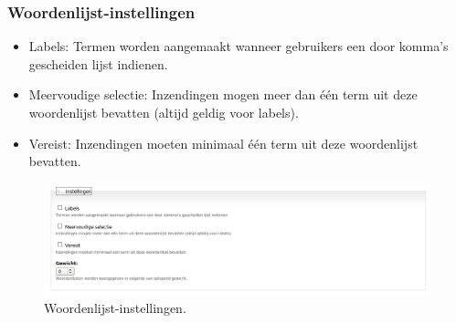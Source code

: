  \subsubsection{Woordenlijst-instellingen} 
 \begin{itemize}
\item Labels: Termen worden aangemaakt wanneer gebruikers een door komma's
gescheiden lijst indienen.
\item Meervoudige selectie: Inzendingen mogen meer dan \'e\'en term uit deze
woordenlijst bevatten (altijd geldig voor labels).
\item Vereist: Inzendingen moeten minimaal \'e\'en term uit deze woordenlijst
bevatten.
\end{itemize}
\begin{figure}[!h]
    \centering
   \includegraphics[scale=0.3,angle=0]{woordenlijst-instellingen}
   \caption{Woordenlijst-instellingen.\label{white}}
 \end{figure}
